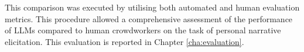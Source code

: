This comparison was executed by utilising both automated and human evaluation metrics. This procedure allowed a comprehensive assessment of the performance of LLMs compared to human crowdworkers on the task of personal narrative elicitation. This evaluation is reported in Chapter \ref{cha:evaluation}.
